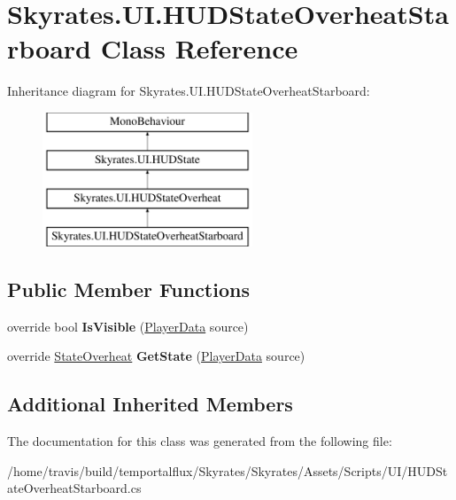 \hypertarget{class_skyrates_1_1_u_i_1_1_h_u_d_state_overheat_starboard}{\section{Skyrates.\-U\-I.\-H\-U\-D\-State\-Overheat\-Starboard Class Reference}
\label{class_skyrates_1_1_u_i_1_1_h_u_d_state_overheat_starboard}
}
Inheritance diagram for Skyrates.\-U\-I.\-H\-U\-D\-State\-Overheat\-Starboard\-:\begin{figure}[H]
\begin{center}
\leavevmode
\includegraphics[height=4.000000cm]{class_skyrates_1_1_u_i_1_1_h_u_d_state_overheat_starboard}
\end{center}
\end{figure}
\subsection*{Public Member Functions}
\begin{DoxyCompactItemize}
\item 
\hypertarget{class_skyrates_1_1_u_i_1_1_h_u_d_state_overheat_starboard_a2f65bafb527ab8a750e91f145bc12bc6}{override bool {\bfseries Is\-Visible} (\hyperlink{class_skyrates_1_1_data_1_1_player_data}{Player\-Data} source)}\label{class_skyrates_1_1_u_i_1_1_h_u_d_state_overheat_starboard_a2f65bafb527ab8a750e91f145bc12bc6}

\item 
\hypertarget{class_skyrates_1_1_u_i_1_1_h_u_d_state_overheat_starboard_a3e3799d1cd1faad293299653d30ec594}{override \hyperlink{class_skyrates_1_1_misc_1_1_state_overheat}{State\-Overheat} {\bfseries Get\-State} (\hyperlink{class_skyrates_1_1_data_1_1_player_data}{Player\-Data} source)}\label{class_skyrates_1_1_u_i_1_1_h_u_d_state_overheat_starboard_a3e3799d1cd1faad293299653d30ec594}

\end{DoxyCompactItemize}
\subsection*{Additional Inherited Members}


The documentation for this class was generated from the following file\-:\begin{DoxyCompactItemize}
\item 
/home/travis/build/temportalflux/\-Skyrates/\-Skyrates/\-Assets/\-Scripts/\-U\-I/H\-U\-D\-State\-Overheat\-Starboard.\-cs\end{DoxyCompactItemize}
